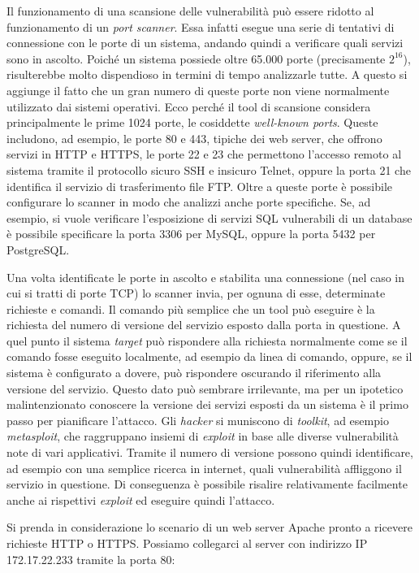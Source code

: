 \documentclass[target=bach,aauheader=]{thud}
\begin{document}
Il funzionamento di una scansione delle vulnerabilità può essere ridotto al funzionamento di un \textit{port scanner}. Essa infatti esegue una serie di tentativi di connessione con le porte di un sistema, andando quindi a verificare quali servizi sono in ascolto. Poiché un sistema possiede oltre 65.000 porte (precisamente \(2^{16}\)), risulterebbe molto dispendioso in termini di tempo analizzarle tutte. A questo si aggiunge il fatto che un gran numero di queste porte non viene normalmente utilizzato dai sistemi operativi. Ecco perché il tool di scansione considera principalmente le prime 1024 porte, le cosiddette \textit{well-known ports}. Queste includono, ad esempio, le porte 80 e 443, tipiche dei web server, che offrono servizi in HTTP e HTTPS, le porte 22 e 23 che permettono l’accesso remoto al sistema tramite il protocollo sicuro SSH e insicuro Telnet, oppure la porta 21 che identifica il servizio di trasferimento file FTP. Oltre a queste porte è possibile configurare lo scanner in modo che analizzi anche porte specifiche. Se, ad esempio, si vuole verificare l’esposizione di servizi SQL vulnerabili di un database è possibile specificare la porta 3306 per MySQL, oppure la porta 5432 per PostgreSQL.

Una volta identificate le porte in ascolto e stabilita una connessione (nel caso in cui si tratti di porte TCP) lo scanner invia, per ognuna di esse, determinate richieste e comandi. Il comando più semplice che un tool può eseguire è la richiesta del numero di versione del servizio esposto dalla porta in questione. A quel punto il sistema \textit{target} può rispondere alla richiesta normalmente come se il comando fosse eseguito localmente, ad esempio da linea di comando, oppure, se il sistema è configurato a dovere, può rispondere oscurando il riferimento alla versione del servizio. Questo dato può sembrare irrilevante, ma per un ipotetico malintenzionato conoscere la versione dei servizi esposti da un sistema è il primo passo per pianificare l’attacco. Gli \textit{hacker} si muniscono di \textit{toolkit}, ad esempio \textit{metasploit}, che raggruppano insiemi di \textit{exploit} in base alle diverse vulnerabilità note di vari applicativi. Tramite il numero di versione possono quindi identificare, ad esempio con una semplice ricerca in internet, quali vulnerabilità affliggono il servizio in questione. Di conseguenza è possibile risalire relativamente facilmente anche ai rispettivi \textit{exploit} ed eseguire quindi l’attacco.

Si prenda in considerazione lo scenario di un web server Apache pronto a ricevere richieste HTTP o HTTPS. Possiamo collegarci al server con indirizzo IP 172.17.22.233 tramite la porta 80:
\end{document}
